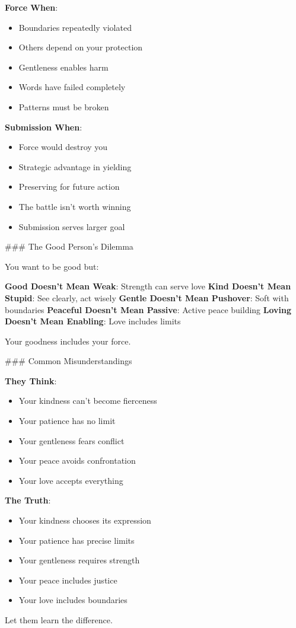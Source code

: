 \documentclass[12pt]{book}
\begin{document}
\textbf{Force When}:
\begin{itemize}
\item Boundaries repeatedly violated
\item Others depend on your protection
\item Gentleness enables harm
\item Words have failed completely
\item Patterns must be broken

\end{itemize}
\textbf{Submission When}:
\begin{itemize}
\item Force would destroy you
\item Strategic advantage in yielding
\item Preserving for future action
\item The battle isn't worth winning
\item Submission serves larger goal

\end{itemize}
\#\#\# The Good Person's Dilemma

You want to be good but:

\textbf{Good Doesn't Mean Weak}: Strength can serve love
\textbf{Kind Doesn't Mean Stupid}: See clearly, act wisely
\textbf{Gentle Doesn't Mean Pushover}: Soft with boundaries
\textbf{Peaceful Doesn't Mean Passive}: Active peace building
\textbf{Loving Doesn't Mean Enabling}: Love includes limits

Your goodness includes your force.

\#\#\# Common Misunderstandings

\textbf{They Think}:
\begin{itemize}
\item Your kindness can't become fierceness
\item Your patience has no limit
\item Your gentleness fears conflict
\item Your peace avoids confrontation
\item Your love accepts everything

\end{itemize}
\textbf{The Truth}:
\begin{itemize}
\item Your kindness chooses its expression
\item Your patience has precise limits
\item Your gentleness requires strength
\item Your peace includes justice
\item Your love includes boundaries

\end{itemize}
Let them learn the difference.
\end{document}
